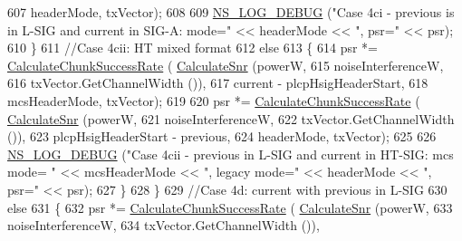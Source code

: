 \begin{DoxyCode}
607                                                     headerMode, txVector);
608 
609                   \hyperlink{group__logging_ga413f1886406d49f59a6a0a89b77b4d0a}{NS\_LOG\_DEBUG} (\textcolor{stringliteral}{"Case 4ci - previous is in L-SIG and current in SIG-A: mode="} 
      << headerMode << \textcolor{stringliteral}{", psr="} << psr);
610                 \}
611               \textcolor{comment}{//Case 4cii: HT mixed format}
612               \textcolor{keywordflow}{else}
613                 \{
614                   psr *= \hyperlink{classns3_1_1InterferenceHelper_ab1c34c3f7ecef1e37ec778c0cf0e9cef}{CalculateChunkSuccessRate} (
      \hyperlink{classns3_1_1InterferenceHelper_a8f6192d041874595004c007c5a519b4b}{CalculateSnr} (powerW,
615                                                                   noiseInterferenceW,
616                                                                   txVector.GetChannelWidth ()),
617                                                     current - plcpHsigHeaderStart,
618                                                     mcsHeaderMode, txVector);
619 
620                   psr *= \hyperlink{classns3_1_1InterferenceHelper_ab1c34c3f7ecef1e37ec778c0cf0e9cef}{CalculateChunkSuccessRate} (
      \hyperlink{classns3_1_1InterferenceHelper_a8f6192d041874595004c007c5a519b4b}{CalculateSnr} (powerW,
621                                                                   noiseInterferenceW,
622                                                                   txVector.GetChannelWidth ()),
623                                                     plcpHsigHeaderStart - previous,
624                                                     headerMode, txVector);
625 
626                   \hyperlink{group__logging_ga413f1886406d49f59a6a0a89b77b4d0a}{NS\_LOG\_DEBUG} (\textcolor{stringliteral}{"Case 4cii - previous in L-SIG and current in HT-SIG: mcs mode=
      "} << mcsHeaderMode << \textcolor{stringliteral}{", legacy mode="} << headerMode << \textcolor{stringliteral}{", psr="} << psr);
627                 \}
628             \}
629           \textcolor{comment}{//Case 4d: current with previous in L-SIG}
630           \textcolor{keywordflow}{else}
631             \{
632               psr *= \hyperlink{classns3_1_1InterferenceHelper_ab1c34c3f7ecef1e37ec778c0cf0e9cef}{CalculateChunkSuccessRate} (
      \hyperlink{classns3_1_1InterferenceHelper_a8f6192d041874595004c007c5a519b4b}{CalculateSnr} (powerW,
633                                                               noiseInterferenceW,
634                                                               txVector.GetChannelWidth ()),

\end{DoxyCode}
